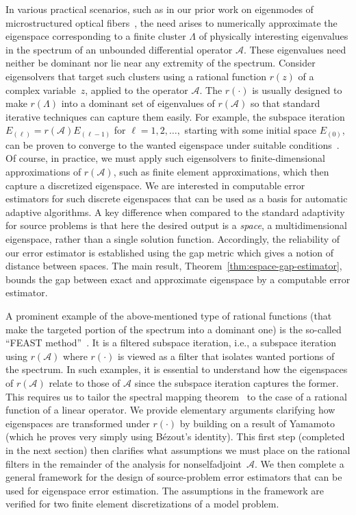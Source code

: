 \documentclass[12pt, oneside, reqno]{amsart}
\theoremstyle{remark}
\newcommand{\vL}{\varLambda}
\newcommand{\Ac}{\mathcal{A}}
\begin{document}
In various practical scenarios, such as in our prior work on eigenmodes of
microstructured optical fibers~\cite{GopGroPinVan2025-1}, the need
arises to numerically approximate the eigenspace corresponding to a
finite cluster $\vL$ of physically interesting eigenvalues in the
spectrum of an unbounded differential operator $\Ac$.  These
eigenvalues need neither be dominant nor lie near any extremity of
the spectrum.  Consider eigensolvers that target  such clusters
using a rational function $r(z)$ of a complex variable~$z$, applied to
the operator $\Ac$. The $r(\cdot)$ is usually designed to make
$r(\vL)$ into a dominant set of eigenvalues of $r(\Ac)$ so that
standard iterative techniques can capture them easily. For example,
the subspace iteration $E_{(\ell)} = r(\Ac) E_{(\ell-1)}$ for
$\ell=1,2,\dots,$ starting with some initial space $E_{(0)}$, can be
proven to converge to the wanted eigenspace under suitable
conditions~\cite{GopGruOva2020-1}.
Of course, in practice, we must apply such eigensolvers to
finite-dimensional approximations of $r(\Ac)$, such as finite element
approximations, which then capture a discretized eigenspace. We are
interested in computable error estimators for such discrete
eigenspaces that can be used as a basis for automatic adaptive
algorithms. A key difference when compared to the standard adaptivity
for source problems is that here the desired output is a {\em space},
a multidimensional eigenspace, rather than a single solution function.
Accordingly, the reliability of our error estimator is established using the gap metric which gives a notion of distance between spaces. The main result,
Theorem~\ref{thm:espace-gap-estimator}, bounds the gap between exact and approximate eigenspace by a computable error estimator.

A prominent example of the above-mentioned type of rational functions
(that make the targeted portion of the spectrum into a dominant one)
is the so-called ``FEAST method''~\cite{GopGruOva2020-1, KesPolPet2016-1, PetPol2014-1, Pol2009-1}.  It is a filtered subspace
iteration, i.e., a subspace iteration using $r(\Ac)$ where $r(\cdot)$
is viewed as a filter that isolates wanted portions of the spectrum.
In such examples, it is essential to understand how the eigenspaces of
$r(\Ac)$ relate to those of $\Ac$ since the subspace iteration
captures the former.  This requires us to tailor the spectral mapping
theorem~\cite{HilPhi1996-1} to the case of a rational function of a
linear operator.  We provide elementary arguments clarifying how
eigenspaces are transformed under $r(\cdot)$ by building on a result of
Yamamoto~\cite{Yam1971-1} (which he proves very simply using
B\'ezout's identity). This first step (completed in the next section)
then clarifies what assumptions we must place on the rational filters
in the remainder of the analysis for nonselfadjoint~$\Ac$.  We then
complete a general
framework for the design of source-problem error estimators that can
be used for eigenspace error estimation. The assumptions in the
framework are verified for two finite element discretizations of a
model problem.
\end{document}
